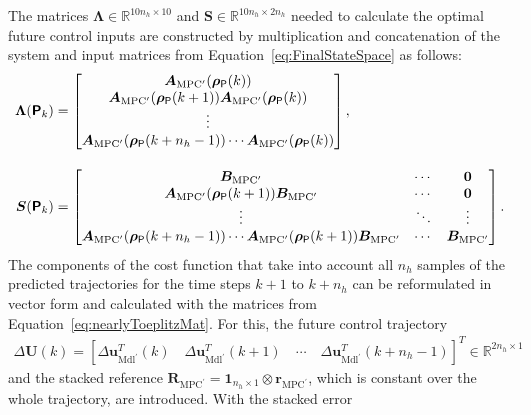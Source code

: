 The matrices \( \bm{\Lambda} \in \mathbb{R}^{10n_h \times 10}\) and \( \bm{S} \in \mathbb{R}^{10n_h \times 2n_h} \) needed to calculate the optimal future control inputs are constructed by multiplication and concatenation of the system and input matrices from Equation~\eqref{eq:FinalStateSpace} as follows:
\begin{equation} \label{eq:nearlyToeplitzMat}
    \begin{aligned}
        \bm{\Lambda}(\bm{\mathsf{P}}_k) &= \begin{bmatrix}
            \bm{A}_{\text{MPC}^\prime}(\bm{\rho}_{\mathsf{P}}(k)) \\
            \bm{A}_{\text{MPC}^\prime}(\bm{\rho}_{\mathsf{P}}(k+1)) \bm{A}_{\text{MPC}^\prime}(\bm{\rho}_{\mathsf{P}}(k)) \\
            \vdots\\
            \bm{A}_{\text{MPC}^\prime}(\bm{\rho}_{\mathsf{P}}(k+n_h-1)) \cdots \bm{A}_{\text{MPC}^\prime}(\bm{\rho}_{\mathsf{P}}(k))
        \end{bmatrix}, \\[10pt]
        \bm{S}(\bm{\mathsf{P}}_k) &=
        \begin{bmatrix}
            \bm{B}_{\text{MPC}^\prime} & \cdots & \bm{0} \\
            \bm{A}_{\text{MPC}^\prime}(\bm{\rho}_{\mathsf{P}}(k+1)) \bm{B}_{\text{MPC}^\prime} & \cdots & \bm{0} \\
            \vdots & \ddots & \vdots \\
            \bm{A}_{\text{MPC}^\prime}(\bm{\rho}_{\mathsf{P}}(k+n_h-1)) \cdots \bm{A}_{\text{MPC}^\prime}(\bm{\rho}_{\mathsf{P}}(k+1)) \bm{B}_{\text{MPC}^\prime} & \cdots & \bm{B}_{\text{MPC}^\prime}
        \end{bmatrix}.
    \end{aligned}
\end{equation}
%
The components of the cost function that take into account all $n_h$ samples of the predicted trajectories for the time steps $k+1$ to $k + n_h$ can be reformulated in vector form and calculated with the matrices from Equation~\eqref{eq:nearlyToeplitzMat}. For this, the future control trajectory
\begin{align*}
    \Delta \bm{U}(k) = \left[\Delta \bm{u}_{\text{Mdl}^\prime}^T(k) \quad \Delta \bm{u}_{\text{Mdl}^\prime}^T(k+1) \quad \cdots \quad \Delta \bm{u}_{\text{Mdl}^\prime}^T(k+ n_h -1) \right]^T \in \mathbb{R}^{2n_h \times 1}
\end{align*}
and the stacked reference $\bm{R}_{\text{MPC}^\prime} = \bm{1}_{n_h \times 1}\otimes \bm{r}_{\text{MPC}^\prime}$, which is constant over the whole trajectory, are introduced. With the stacked error
